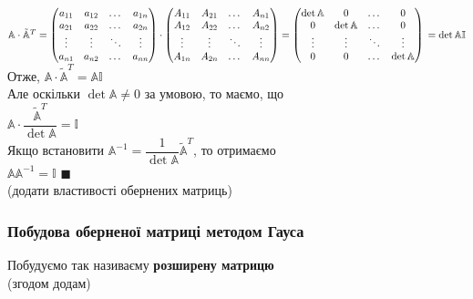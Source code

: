 \documentclass[a4paper, 14pt]{extarticle}
\def\bigline{\vspace{5mm}\\}
\def\qed{$\blacksquare$}
\begin{document}
$\mathbb{A} \cdot \tilde{\mathbb{A}}^T = \begin{pmatrix}
a_{11} & a_{12} & \dots & a_{1n} \\
a_{21} & a_{22} & \dots & a_{2n} \\
\vdots & \vdots & \ddots & \vdots \\
a_{n1} & a_{n2} & \dots & a_{nn} \\
\end{pmatrix} \cdot \begin{pmatrix}
A_{11} & A_{21} & \dots & A_{n1} \\
A_{12} & A_{22} & \dots & A_{n2} \\
\vdots & \vdots & \ddots & \vdots \\
A_{1n} & A_{2n} & \dots & A_{nn} \\
\end{pmatrix} = \begin{pmatrix}
\det \mathbb{A} & 0 & \dots & 0 \\
0 & \det \mathbb{A} & \dots & 0 \\
\vdots & \vdots & \ddots & \vdots \\
0 & 0 & \dots & \det \mathbb{A} \\
\end{pmatrix} \\ = \det \mathbb{A} \mathbb{I}$\\
Отже, $\mathbb{A} \cdot \tilde{\mathbb{A}}^T = \mathbb{A} \mathbb{I}$\\
Але оскільки $\det \mathbb{A} \neq 0$ за умовою, то маємо, що\\
$\mathbb{A} \cdot \dfrac{\tilde{\mathbb{A}}^T}{\det \mathbb{A}} = \mathbb{I}$\\
Якщо встановити $\mathbb{A}^{-1} = \dfrac{1}{\det \mathbb{A}} \tilde{\mathbb{A}}^T$, то отримаємо\\
$\mathbb{A} \mathbb{A}^{-1} = \mathbb{I}$ \qed
\bigline
(додати властивості обернених матриць)

\subsubsection*{Побудова оберненої матриці методом Гауса}
Побудуємо так називаєму \textbf{розширену матрицю}\\
(згодом додам)
\end{document}
